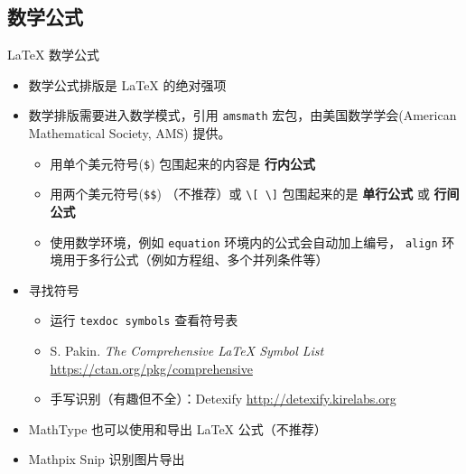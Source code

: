     \subsection{数学公式}
    \begin{frame}[fragile]{\LaTeX{} 数学公式}
        \begin{itemize}
        \item 数学公式排版是 \LaTeX{} 的绝对强项
        \item 数学排版需要进入数学模式，引用 \texttt{amsmath} 宏包，由美国数学学会(American Mathematical Society, AMS) 提供。
            \begin{itemize}
            \item 用单个美元符号(\verb|$|) 包围起来的内容是 {\bf 行内公式}
          \item 用两个美元符号(\verb|$$|) （不推荐）或 \verb|\[ \]| 包围起来的是 {\bf 单行公式} 或 {\bf 行间公式}
            \item 使用数学环境，例如 \texttt{equation} 环境内的公式会自动加上编号，
                \texttt{align} 环境用于多行公式（例如方程组、多个并列条件等）
          \end{itemize}
        \item 寻找符号
            \begin{itemize}
              \item 运行 \texttt{texdoc symbols} 查看符号表
              \item S. Pakin. \emph{The Comprehensive \LaTeX{} Symbol List}
                    \url{https://ctan.org/pkg/comprehensive}
              \item 手写识别（有趣但不全）：Detexify \url{http://detexify.kirelabs.org}
            \end{itemize}
        \item MathType 也可以使用和导出 \LaTeX{} 公式（不推荐）
        \item Mathpix Snip 识别图片导出
        \end{itemize}
        \end{frame}
    
